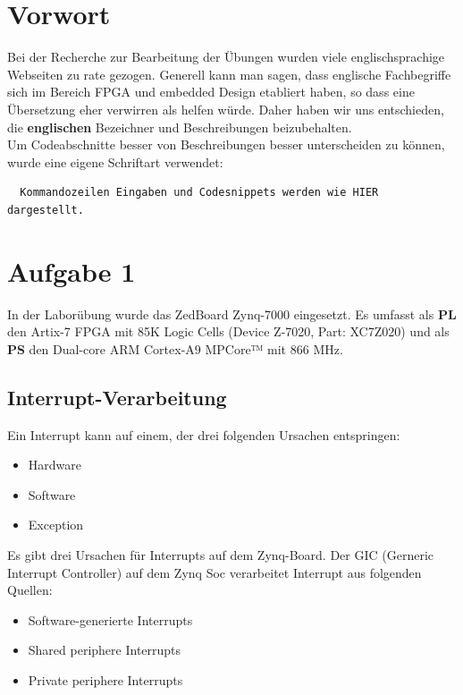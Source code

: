 \section{Vorwort}
Bei der Recherche zur Bearbeitung der Übungen wurden viele englischsprachige Webseiten zu rate gezogen. Generell kann man sagen, dass englische Fachbegriffe sich im Bereich FPGA und embedded Design etabliert haben, so dass eine Übersetzung eher verwirren als helfen würde. Daher haben wir uns entschieden, die \textbf{englischen} Bezeichner und Beschreibungen beizubehalten.\\
Um Codeabschnitte besser von Beschreibungen besser unterscheiden zu können, wurde eine eigene Schriftart verwendet:
\begin{verbatim}
  Kommandozeilen Eingaben und Codesnippets werden wie HIER dargestellt.
\end{verbatim}

\section{Aufgabe 1} \label{ex1}
In der Laborübung wurde das ZedBoard Zynq-7000 eingesetzt. Es umfasst als \textbf{PL} den Artix-7 FPGA mit 85K Logic Cells (Device Z-7020, Part: XC7Z020) und als \textbf{PS} den Dual-core ARM Cortex-A9 MPCore™ mit 866 MHz.

\subsection{Interrupt-Verarbeitung}
Ein Interrupt kann auf einem, der drei folgenden Ursachen entspringen:
\begin{itemize}
  \item Hardware
  \item Software
  \item Exception
\end{itemize}

Es gibt drei Ursachen für Interrupts auf dem Zynq-Board. 
Der GIC (Gerneric Interrupt Controller) auf dem Zynq Soc verarbeitet Interrupt aus folgenden Quellen:
\begin{itemize}
  \item Software-generierte Interrupts
  \item Shared periphere Interrupts
  \item Private periphere Interrupts
\end{itemize}


